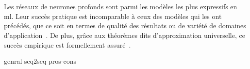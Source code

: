 
\section{}
\label{sec.mlp}

Les réseaux de neurones profonds sont parmi les modèles les plus expressifs en \gls{ml}.
Leur succès pratique est incomparable à ceux des modèles qui les ont précédés, 
que ce soit en termes de qualité des résultats ou de variété de domaines d'application~\cite{Raschka_Mirjalili_2017}.
De plus, grâce aux théorèmes dits d'approximation universelle, 
ce succès empirique est formellement assuré~\parencite{Calin_2020}.

{genral}
{seq2seq}
{pros-cons}